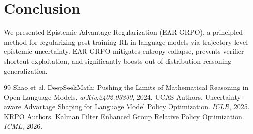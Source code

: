 \documentclass[11pt,a4paper]{article}
\begin{document}
\section{Conclusion}
We presented Epistemic Advantage Regularization (EAR-GRPO), a principled method for regularizing post-training RL in language models via trajectory-level epistemic uncertainty. EAR-GRPO mitigates entropy collapse, prevents verifier shortcut exploitation, and significantly boosts out-of-distribution reasoning generalization.


\begin{thebibliography}{99}
 Shao et al. DeepSeekMath: Pushing the Limits of Mathematical Reasoning in Open Language Models. \textit{arXiv:2402.03300}, 2024.
 UCAS Authors. Uncertainty-aware Advantage Shaping for Language Model Policy Optimization. \textit{ICLR}, 2025.
 KRPO Authors. Kalman Filter Enhanced Group Relative Policy Optimization. \textit{ICML}, 2026.
\end{thebibliography}
\end{document}

